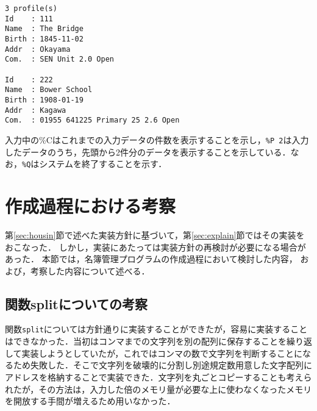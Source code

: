 \documentclass[a4j,11pt]{jarticle}
\begin{document}
{\fontsize{10pt}{11pt} \selectfont
 \begin{verbatim}
3 profile(s)
Id    : 111
Name  : The Bridge
Birth : 1845-11-02
Addr  : Okayama
Com.  : SEN Unit 2.0 Open

Id    : 222
Name  : Bower School
Birth : 1908-01-19
Addr  : Kagawa
Com.  : 01955 641225 Primary 25 2.6 Open

 \end{verbatim}
}

\noindent
入力中の\%Cはこれまでの入力データの件数を表示することを示し，\verb|%P 2|は入力したデータのうち，先頭から2件分のデータを表示することを示している．なお，\verb|%Q|はシステムを終了することを示す．

\section{作成過程における考察}


第\ref{sec:housin}節で述べた実装方針に基づいて，第\ref{sec:explain}節ではその実装をおこなった．
しかし，実装にあたっては実装方針の再検討が必要になる場合があった．
本節では，名簿管理プログラムの作成過程において検討した内容，
および，考察した内容について述べる．

\subsection{関数splitについての考察}

関数\verb|split|については方針通りに実装することができたが，容易に実装することはできなかった．当初はコンマまでの文字列を別の配列に保存することを繰り返して実装しようとしていたが，これではコンマの数で文字列を判断することになるため失敗した．そこで文字列を破壊的に分割し別途規定数用意した文字配列にアドレスを格納することで実装できた．文字列を丸ごとコピーすることも考えられたが，その方法は，入力した倍のメモリ量が必要な上に使わなくなったメモリを開放する手間が増えるため用いなかった．

\end{document}
